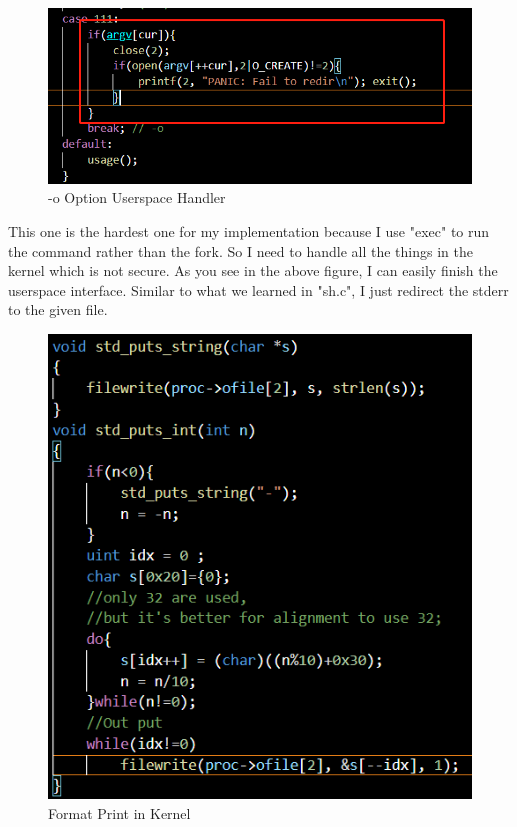 \documentclass[11pt,oneside,a4paper]{article}
\begin{document}
\begin{figure}[H]
    \includegraphics[width=4.75in]{1-33.png}
    \centering
    \caption{-o Option Userspace Handler}
\end{figure}

This one is the hardest one for my implementation because I use "exec" to run the command
rather than the fork. So I need to handle all the things in the kernel which is not secure.
As you see in the above figure, I can easily finish the userspace interface. Similar to what 
we learned in "sh.c", I just redirect the stderr to the given file. 

\begin{figure}[H]
    \includegraphics[width=4.75in]{1-34.png}
    \centering
    \caption{Format Print in Kernel}
\end{figure}
\end{document}
